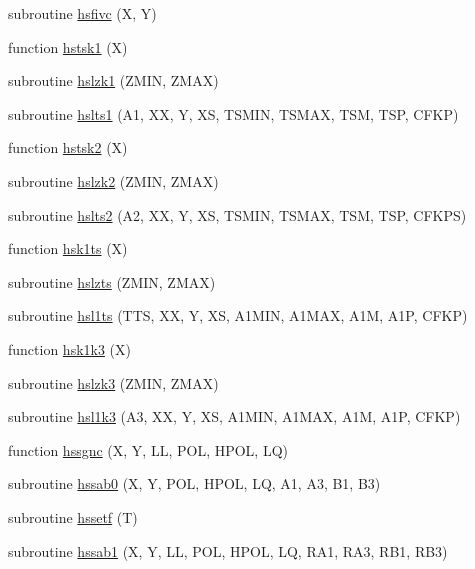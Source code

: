 \begin{DoxyCompactItemize}
\item 
subroutine \hyperlink{djangoh__h_8f_a23b8c9868ae8791b60c787b7c9d8f6c2}{hsfivc} (X, Y)
\item 
function \hyperlink{djangoh__h_8f_ad0b2c59952700c259f58d2541555ac65}{hstsk1} (X)
\item 
subroutine \hyperlink{djangoh__h_8f_aa2758c7c67c101829423ac8239b00e62}{hslzk1} (Z\+M\+I\+N, Z\+M\+A\+X)
\item 
subroutine \hyperlink{djangoh__h_8f_ae4db38c1fc3b0a5dc77baf9d22e21aee}{hslts1} (A1, X\+X, Y, X\+S, T\+S\+M\+I\+N, T\+S\+M\+A\+X, T\+S\+M, T\+S\+P, C\+F\+K\+P)
\item 
function \hyperlink{djangoh__h_8f_adc1cb09f2687cf5b9932be168cea4fb2}{hstsk2} (X)
\item 
subroutine \hyperlink{djangoh__h_8f_ac76dab3307c7242c03f4c84e184655b4}{hslzk2} (Z\+M\+I\+N, Z\+M\+A\+X)
\item 
subroutine \hyperlink{djangoh__h_8f_a1c48c9d9f00ce080540e6074ae6f2464}{hslts2} (A2, X\+X, Y, X\+S, T\+S\+M\+I\+N, T\+S\+M\+A\+X, T\+S\+M, T\+S\+P, C\+F\+K\+P\+S)
\item 
function \hyperlink{djangoh__h_8f_a692a9648fb9a7a3fb31ce19d43f93320}{hsk1ts} (X)
\item 
subroutine \hyperlink{djangoh__h_8f_a7b2ae9bd269d18a4870a966f53575c8f}{hslzts} (Z\+M\+I\+N, Z\+M\+A\+X)
\item 
subroutine \hyperlink{djangoh__h_8f_ace5a98ed477cad1bb311954ce4a0ad57}{hsl1ts} (T\+T\+S, X\+X, Y, X\+S, A1\+M\+I\+N, A1\+M\+A\+X, A1\+M, A1\+P, C\+F\+K\+P)
\item 
function \hyperlink{djangoh__h_8f_a53c5a7b73ac0147b97ff74b75f5ae5bb}{hsk1k3} (X)
\item 
subroutine \hyperlink{djangoh__h_8f_a2857c36abf6cf55c0980cfaa59a9f348}{hslzk3} (Z\+M\+I\+N, Z\+M\+A\+X)
\item 
subroutine \hyperlink{djangoh__h_8f_a3a4516117594d1ccca1c03af99d73875}{hsl1k3} (A3, X\+X, Y, X\+S, A1\+M\+I\+N, A1\+M\+A\+X, A1\+M, A1\+P, C\+F\+K\+P)
\item 
function \hyperlink{djangoh__h_8f_a8df1ca1337492f14b9737435536efb25}{hssgnc} (X, Y, L\+L, P\+O\+L, H\+P\+O\+L, L\+Q)
\item 
subroutine \hyperlink{djangoh__h_8f_aa4a5469528c1a861aede141deda31ef9}{hssab0} (X, Y, P\+O\+L, H\+P\+O\+L, L\+Q, A1, A3, B1, B3)
\item 
subroutine \hyperlink{djangoh__h_8f_a56a21f2f4c8f198faf695976bb121eb2}{hssetf} (T)
\item 
subroutine \hyperlink{djangoh__h_8f_ae79d168be183460bb3a8f1ba4f6f983c}{hssab1} (X, Y, L\+L, P\+O\+L, H\+P\+O\+L, L\+Q, R\+A1, R\+A3, R\+B1, R\+B3)

\end{DoxyCompactItemize}
